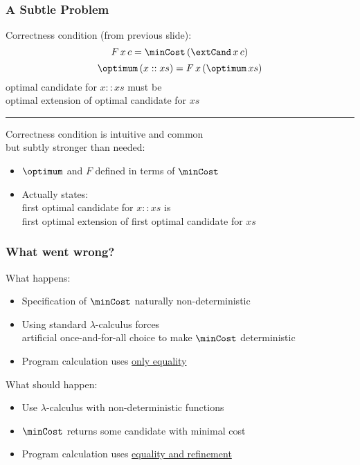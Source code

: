 \documentclass{beamer}
\begin{document}
\begin{frame}\frametitle{A Subtle Problem}
{{\color{gray}
Correctness condition (from previous slide):
  \[F\,x\,c = \minCost\,(\extCand\,x\,c)\]
  \[\optimum\,(x::xs) = F\,x\,(\optimum\,xs)\]
optimal candidate for $x::xs$ must be \\ optimal extension of optimal candidate for $xs$
}}
\hrule
\vspace{.5cm}

Correctness condition is intuitive and common\\
but subtly stronger than needed:
\begin{itemize}
\item $\optimum$ and $F$ defined in terms of $\minCost$
\item Actually states:\\
  \alert{first} optimal candidate for $x::xs$ is \\ \alert{first} optimal extension of \alert{first} optimal candidate for $xs$
\end{itemize}
\end{frame}

\begin{frame}\frametitle{What went wrong?}
What happens:
\begin{itemize}
\item Specification of $\minCost$ naturally non-deterministic
\item Using standard $\lambda$-calculus forces\\ artificial once-and-for-all choice to make $\minCost$ deterministic
\item Program calculation uses \underline{only equality}
\end{itemize}

What should happen:
\begin{itemize}
\item Use $\lambda$-calculus with non-deterministic functions
\item $\minCost$ returns \alert{some} candidate with minimal cost
\item Program calculation uses \underline{equality and refinement}
\end{itemize}

\end{frame}
\end{document}
